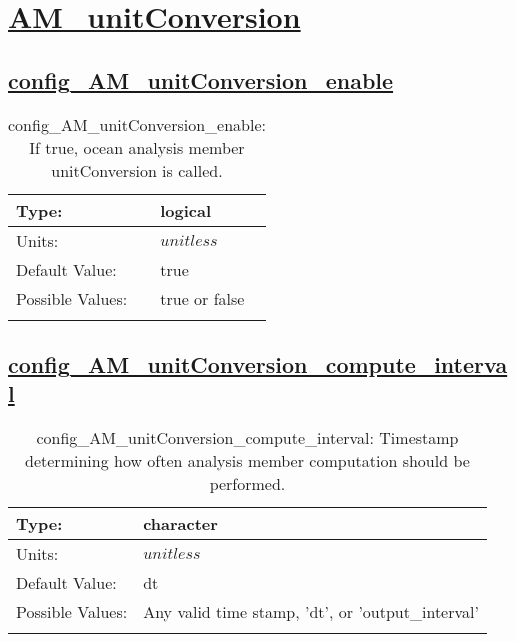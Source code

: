 \section[AM\_unitConversion]{\hyperref[sec:nm_tab_AM_unitConversion]{AM\_unitConversion}}
\label{sec:nm_sec_AM_unitConversion}
\subsection[config\_AM\_unitConversion\_enable]{\hyperref[sec:nm_tab_AM_unitConversion]{config\_AM\_unitConversion\_enable}}
\label{subsec:nm_sec_config_AM_unitConversion_enable}
\begin{center}
\begin{longtable}{| p{2.0in} || p{4.0in} |}
    \hline
    Type: & logical \\
    \hline
    Units: & $unitless$ \\
    \hline
    Default Value: & true \\
    \hline
    Possible Values: & true or false \\
    \hline
    \caption{config\_AM\_unitConversion\_enable: If true, ocean analysis member unitConversion is called.}
\end{longtable}
\end{center}
\subsection[config\_AM\_unitConversion\_compute\_interval]{\hyperref[sec:nm_tab_AM_unitConversion]{config\_AM\_unitConversion\_compute\_interval}}
\label{subsec:nm_sec_config_AM_unitConversion_compute_interval}
\begin{center}
\begin{longtable}{| p{2.0in} || p{4.0in} |}
    \hline
    Type: & character \\
    \hline
    Units: & $unitless$ \\
    \hline
    Default Value: & dt \\
    \hline
    Possible Values: & Any valid time stamp, 'dt', or 'output\_interval' \\
    \hline
    \caption{config\_AM\_unitConversion\_compute\_interval: Timestamp determining how often analysis member computation should be performed.}
\end{longtable}
\end{center}
